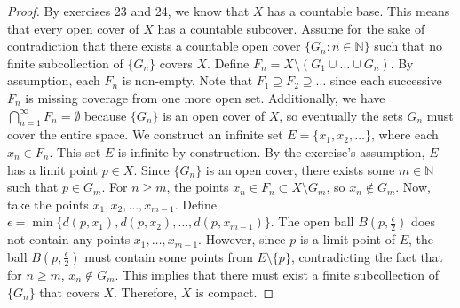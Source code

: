 \documentclass[12pt]{article}
\begin{document}
\begin{exercise}{26}
    \begin{proof} 
        By exercises 23 and 24, we know that \( X \) has a countable base. This means that every open cover of \( X \) has a countable subcover. Assume for the sake of contradiction that there exists a countable open cover \( \{ G_n : n \in \mathbb{N} \} \) such that no finite subcollection of \( \{ G_n \} \) covers \( X \). Define \( F_n = X \setminus (G_1 \cup \dots \cup G_n) \). By assumption, each \( F_n \) is non-empty. Note that \( F_1 \supseteq F_2 \supseteq \dots \) since each successive \( F_n \) is missing coverage from one more open set. Additionally, we have \( \bigcap_{n = 1}^\infty F_n = \emptyset \) because \( \{ G_n \} \) is an open cover of \( X \), so eventually the sets \( G_n \) must cover the entire space. We construct an infinite set \( E = \{ x_1, x_2, \dots \} \), where each \( x_n \in F_n \). This set \( E \) is infinite by construction. By the exercise's assumption, \( E \) has a limit point \( p \in X \). Since \( \{ G_n \} \) is an open cover, there exists some \( m \in \mathbb{N} \) such that \( p \in G_m \). For \( n \ge m \), the points \( x_n \in F_n \subset X \setminus G_m \), so \( x_n \notin G_m \). Now, take the points \( x_1, x_2, \dots, x_{m-1} \). Define \( \epsilon = \min \{ d(p, x_1), d(p, x_2), \dots, d(p, x_{m-1}) \} \). The open ball \( B(p, \frac{\epsilon}{2}) \) does not contain any points \( x_1, \dots, x_{m-1} \). However, since \( p \) is a limit point of \( E \), the ball \( B(p, \frac{\epsilon}{2}) \) must contain some points from \( E \setminus \{ p \} \), contradicting the fact that for \( n \ge m \), \( x_n \notin G_m \). This implies that there must exist a finite subcollection of \( \{ G_n \} \) that covers \( X \). Therefore, \( X \) is compact. 
    \end{proof}
\end{exercise}
\end{document}
